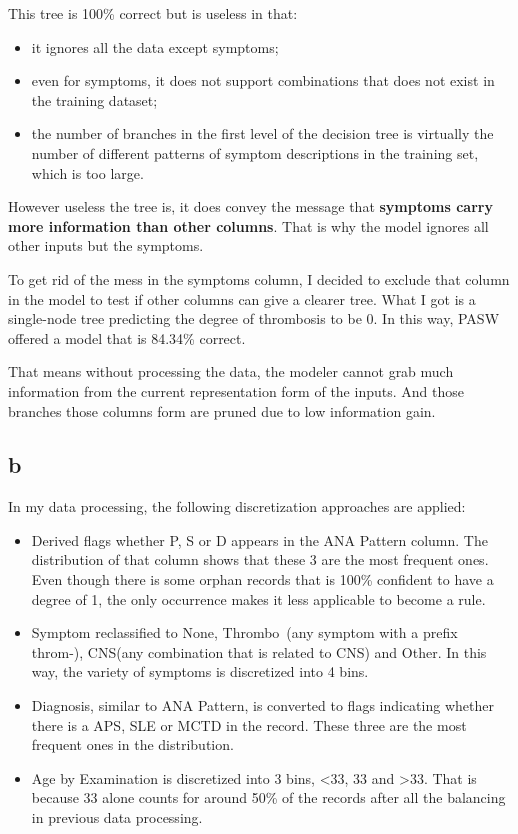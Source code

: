 \documentclass[12pt]{article}
\begin{document}
This tree is 100\% correct but is useless in that:
\begin{itemize}
	\item it ignores all the data except symptoms;
	\item even for symptoms, it does not support combinations that does not exist in the training dataset;
	\item the number of branches in the first level of the decision tree is virtually the number of different patterns of symptom descriptions in the training set, which is too large.
\end{itemize}

However useless the tree is, it does convey the message that \textbf{symptoms carry more information than other columns}. That is why the model ignores all other inputs but the symptoms.

To get rid of the mess in the symptoms column, I decided to exclude that column in the model to test if other columns can give a clearer tree. What I got is a single-node tree predicting the degree of thrombosis to be 0. In this way, PASW offered a model that is 84.34\% correct.

That means without processing the data, the modeler cannot grab much information from the current representation form of the inputs. And those branches those columns form are pruned due to low information gain.

\subsection{b} %
\label{sub:4b}
In my data processing, the following discretization approaches are applied:
\begin{itemize}
	\item Derived flags whether P, S or D  appears in the ANA Pattern column. The distribution of that column shows that these 3 are the most frequent ones. Even though there is some orphan records that is 100\% confident to have a degree of 1, the only occurrence makes it less applicable to become a rule.
	\item Symptom reclassified to None, Thrombo~(any symptom with a prefix throm-), CNS(any combination that is related to CNS) and Other. In this way, the variety of symptoms is discretized into 4 bins.
	\item Diagnosis, similar to ANA Pattern, is converted to flags indicating whether there is a APS, SLE or MCTD in the record. These three are the most frequent ones in the distribution.
	\item Age by Examination is discretized into 3 bins, <33, 33 and >33. That is because 33 alone counts for around 50\% of the records after all the balancing in previous data processing.
\end{itemize}
\end{document}
